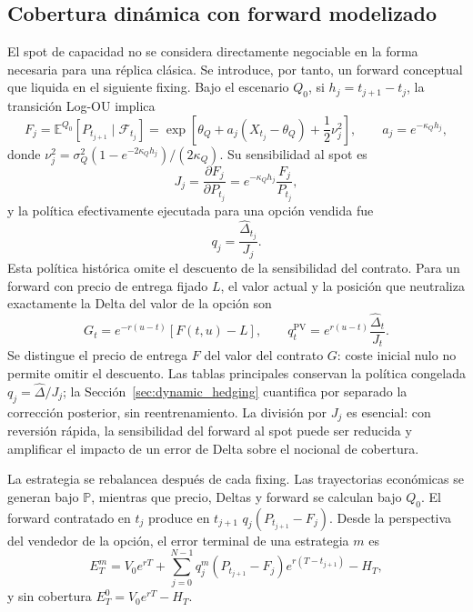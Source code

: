 \subsection*{Cobertura dinámica con forward modelizado}

El spot de capacidad no se considera directamente negociable en la forma
necesaria para una réplica clásica. Se introduce, por tanto, un forward
conceptual que liquida en el siguiente fixing. Bajo el escenario $Q_0$, si
$h_j=t_{j+1}-t_j$, la transición Log-OU implica
\begin{equation}
    F_j=\mathbb E^{Q_0}[P_{t_{j+1}}\mid\mathcal F_{t_j}]
    =\exp\left[\theta_Q+a_j(X_{t_j}-\theta_Q)+\frac{1}{2}\nu_j^2\right],
    \qquad a_j=e^{-\kappa_Qh_j},
    \label{eq:logou_forward}
\end{equation}
donde $\nu_j^2=\sigma_Q^2(1-e^{-2\kappa_Qh_j})/(2\kappa_Q)$. Su sensibilidad
al spot es
\begin{equation}
    J_j=\frac{\partial F_j}{\partial P_{t_j}}
    =e^{-\kappa_Qh_j}\frac{F_j}{P_{t_j}},
    \label{eq:forward_spot_jacobian}
\end{equation}
y la política efectivamente ejecutada para una opción vendida fue
\begin{equation}
    q_j=\frac{\widehat\Delta_{t_j}}{J_j}.
    \label{eq:forward_hedge_ratio}
\end{equation}
Esta política histórica omite el descuento de la sensibilidad del contrato.
Para un forward con precio de entrega fijado $L$, el valor actual y la posición
que neutraliza exactamente la Delta del valor de la opción son
\begin{equation}
    G_t=e^{-r(u-t)}[F(t,u)-L],\qquad
    q_t^{\mathrm{PV}}=e^{r(u-t)}\frac{\widehat\Delta_t}{J_t}.
    \label{eq:forward_pv_correction}
\end{equation}
Se distingue el precio de entrega $F$ del valor del contrato $G$: coste inicial
nulo no permite omitir el descuento. Las tablas principales conservan la política
congelada $q_j=\widehat\Delta/J_j$; la Sección~\ref{sec:dynamic_hedging}
cuantifica por separado la corrección posterior, sin reentrenamiento.
La división por $J_j$ es esencial: con reversión rápida, la sensibilidad del
forward al spot puede ser reducida y amplificar el impacto de un error de Delta
sobre el nocional de cobertura.

La estrategia se rebalancea después de cada fixing. Las trayectorias económicas
se generan bajo $\mathbb P$, mientras que precio, Deltas y forward se calculan
bajo $Q_0$. El forward contratado en $t_j$ produce en $t_{j+1}$
$q_j(P_{t_{j+1}}-F_j)$. Desde la perspectiva del vendedor de la opción, el error
terminal de una estrategia $m$ es
\begin{equation}
    E_T^{m}=V_0e^{rT}
    +\sum_{j=0}^{N-1}q_j^{m}(P_{t_{j+1}}-F_j)e^{r(T-t_{j+1})}
    -H_T,
    \label{eq:dynamic_terminal_hedge_error}
\end{equation}
y sin cobertura $E_T^0=V_0e^{rT}-H_T$.

